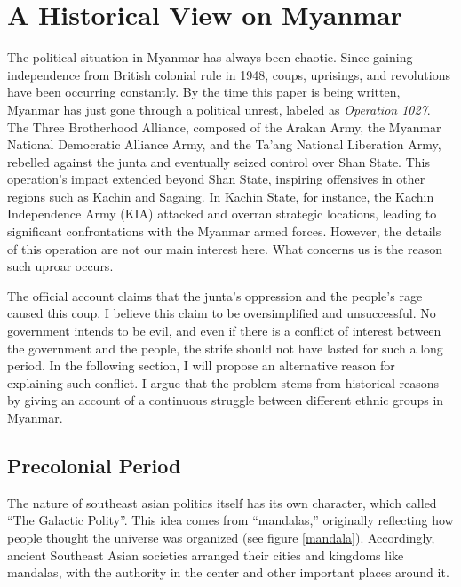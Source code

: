 \documentclass{article}
\begin{document}
\section{A Historical View on Myanmar}

The political situation in Myanmar has always been chaotic. Since gaining independence from British colonial rule in 1948, coups, uprisings, and revolutions have been occurring constantly. By the time this paper is being written, Myanmar has just gone through a political unrest, labeled as \textit{Operation 1027}. The Three Brotherhood Alliance, composed of the Arakan Army, the Myanmar National Democratic Alliance Army, and the Ta’ang National Liberation Army, rebelled against the junta and eventually seized control over Shan State.\autocite{yunsunOperation1027Changing2024} This operation's impact extended beyond Shan State, inspiring offensives in other regions such as Kachin and Sagaing. In Kachin State, for instance, the Kachin Independence Army (KIA) attacked and overran strategic locations, leading to significant confrontations with the Myanmar armed forces.\autocite{theinternationalinstituteforstrategicstudiesOperation1027Reshapes2023} However, the details of this operation are not our main interest here. What concerns us is the reason such uproar occurs.

The official account claims that the junta's oppression and the people's rage caused this coup.\autocite{htetminlwinOperation1027End2023} I believe this claim to be oversimplified and unsuccessful. No government intends to be evil, and even if there is a conflict of interest between the government and the people, the strife should not have lasted for such a long period. In the following section, I will propose an alternative reason for explaining such conflict. I argue that the problem stems from historical reasons by giving an account of a continuous struggle between different ethnic groups in Myanmar.

\subsection{Precolonial Period}

The nature of southeast asian politics itself has its own character, which \textcite{tambiahGalacticPolity2007} called ``The Galactic Polity''. This idea comes from ``mandalas,'' originally reflecting how people thought the universe was organized (see figure \ref{mandala}). Accordingly, ancient Southeast Asian societies arranged their cities and kingdoms like mandalas, with the authority in the center and other important places around it. 
\end{document}
